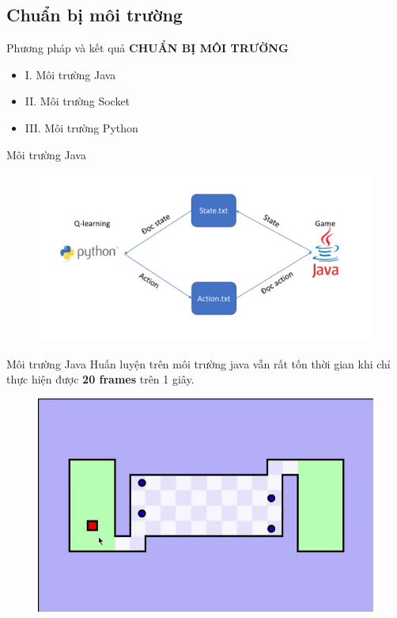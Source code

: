 \documentclass{beamer}
\begin{document}
\subsection{Chuẩn bị môi trường}
\begin{frame}{Phương pháp và kết quả}
	\centering
	\huge\textbf{CHUẨN BỊ MÔI TRƯỜNG}
	\vfill
	\begin{itemize}
	    \item \small I.   Môi trường Java
	    \item \small II.  Môi trường Socket
	    \item \small III. Môi trường Python
	\end{itemize}
\end{frame}
\begin{frame}{Môi trường Java}
\begin{figure}
	\centering
	\includegraphics[scale=.4]{Pic/transfer_java_env}
	\captionsetup{labelformat=empty}
\end{figure}
\end{frame}
\begin{frame}{Môi trường Java}
	Huấn luyện trên môi trường java vẫn rất tốn thời gian khi chỉ thực hiện được \textbf{20 frames} trên 1 giây.
	\begin{figure}
		\centering
		\includegraphics[scale=.3]{Pic/slide/WHG_lv1}
		\captionsetup{labelformat=empty}
	\end{figure}
\end{frame}
\end{document}
